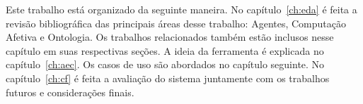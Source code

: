 Este trabalho está organizado da seguinte maneira. No capítulo~\ref{ch:eda}
é feita a revisão bibliográfica das principais áreas desse trabalho:
Agentes, Computação Afetiva e Ontologia. Os trabalhos relacionados também
estão inclusos nesse capítulo em suas respectivas seções. A ideia da
ferramenta é explicada no capítulo~\ref{ch:aec}. Os casos de uso são abordados no
capítulo seguinte. No capítulo~\ref{ch:cf} é feita a avaliação do sistema
juntamente com os trabalhos futuros e considerações finais.
